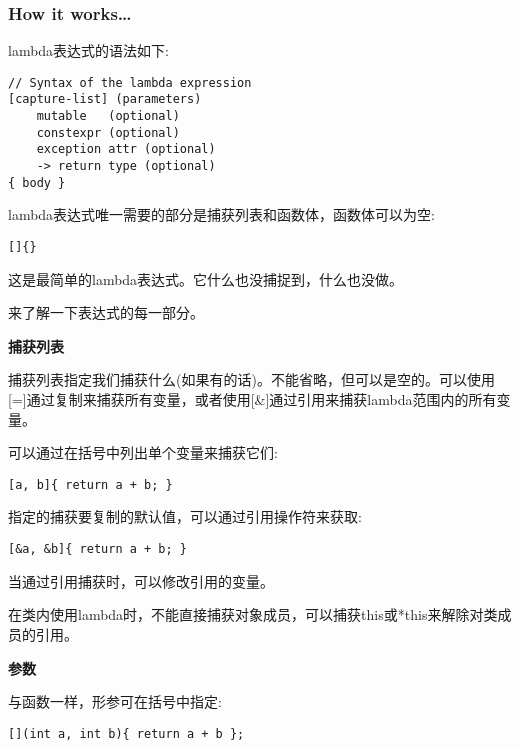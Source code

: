 \subsubsection{How it works…}

lambda表达式的语法如下:

\begin{lstlisting}[style=styleCXX]
// Syntax of the lambda expression
[capture-list] (parameters)
	mutable   (optional)
	constexpr (optional)
	exception attr (optional)
	-> return type (optional)
{ body }
\end{lstlisting}

lambda表达式唯一需要的部分是捕获列表和函数体，函数体可以为空:

\begin{lstlisting}[style=styleCXX]
[]{}
\end{lstlisting}

这是最简单的lambda表达式。它什么也没捕捉到，什么也没做。

来了解一下表达式的每一部分。

\noindent
\textbf{捕获列表}

捕获列表指定我们捕获什么(如果有的话)。不能省略，但可以是空的。可以使用[=]通过复制来捕获所有变量，或者使用[\&]通过引用来捕获lambda范围内的所有变量。

可以通过在括号中列出单个变量来捕获它们:

\begin{lstlisting}[style=styleCXX]
[a, b]{ return a + b; }
\end{lstlisting}

指定的捕获要复制的默认值，可以通过引用操作符来获取:

\begin{lstlisting}[style=styleCXX]
[&a, &b]{ return a + b; }
\end{lstlisting}

当通过引用捕获时，可以修改引用的变量。

\begin{tcolorbox}[colback=webgreen!5!white,colframe=webgreen!75!black,title=Note]
在类内使用lambda时，不能直接捕获对象成员，可以捕获this或*this来解除对类成员的引用。
\end{tcolorbox}

\noindent
\textbf{参数}

与函数一样，形参可在括号中指定:

\begin{lstlisting}[style=styleCXX]
[](int a, int b){ return a + b };
\end{lstlisting}

